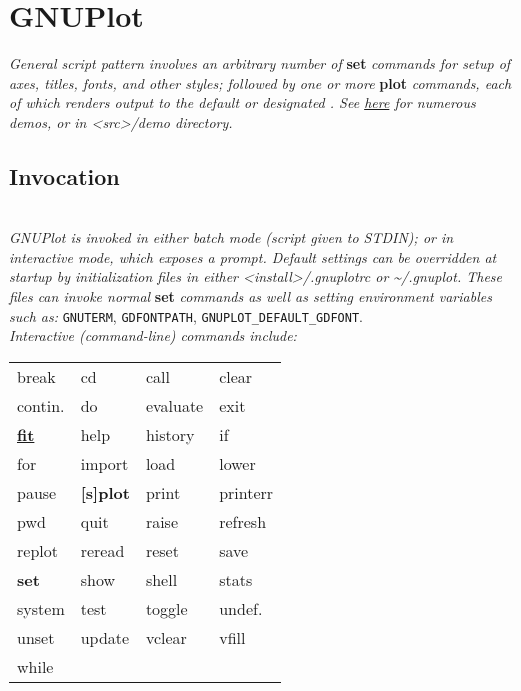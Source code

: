 \section{GNUPlot}
\textit{General script pattern involves an arbitrary number of }\textbf{set}\textit{ commands for setup of axes, titles, fonts, and other styles; followed by one or more }\textbf{plot}\textit{ commands, each of which renders output to the default or designated . See \href{http://gnuplot.info/demos/}{here} for numerous demos, or in <src>/demo directory.}


\subsection*{Invocation}
\\[2mm]
\textit{GNUPlot is invoked in either batch mode (script given to STDIN); or in interactive mode, which exposes a prompt. Default settings can be overridden at startup by initialization files in either <install>/.gnuplotrc or \textasciitilde /.gnuplot. These files can invoke normal }\textbf{set}\textit{ commands as well as setting environment variables such as: } \texttt{GNUTERM}, \texttt{GDFONTPATH}, \texttt{GNUPLOT\_DEFAULT\_GDFONT}. \\[2mm]
\textit{Interactive (command-line) commands include:} 
{\footnotesize 
\begin{tabular}{l l l l}
    break       & cd            & call      &   clear   \\
    contin.     & do            & evaluate  &   exit    \\      
    \href{http://www.gnuplot.info/demo/fit.html}{\textbf{fit}}  & help        & history   & if        \\
    for         & import        & load      & lower     \\
    pause       & \textbf{[s]plot}  & print & printerr  \\
    pwd         & quit          & raise     & refresh   \\
    replot      & reread        & reset     & save      \\
    \textbf{set}  & show        & shell     & stats     \\
    system      & test          & toggle    & undef.    \\
    unset       & update        & vclear    & vfill     \\
    while
\end{tabular}}


